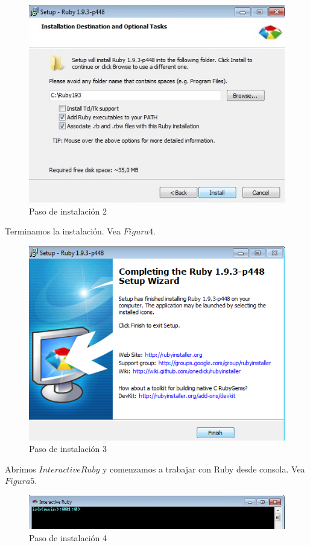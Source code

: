 \documentclass[11pt]{article} %
\begin{document}
\begin{itemize}
{\begin{figure}[h]
\centering
 \includegraphics[width=14cm]{./imagenes/PasoInst2.jpg}
\caption{Paso de instalación 2}\label{Fig:Paso2}
\end{figure}}

\newpage
{Terminamos la instalación. Vea  $Figura 4$.\\

\begin{figure}[h]
\centering
 \includegraphics[width=14cm]{./imagenes/PasoInst3.jpg}
\caption{Paso de instalación 3}\label{Fig:Paso3}
\end{figure}}

Abrimos  $Interactive Ruby$ y comenzamos a trabajar con Ruby desde consola. Vea $ Figura 5$.
\begin{figure}[h]
\centering
 \includegraphics[width=16cm]{./imagenes/PasoInst4.jpg}
\caption{Paso de instalación 4}\label{Fig:Paso4}
\end{figure}


\end{itemize}
\end{document}
